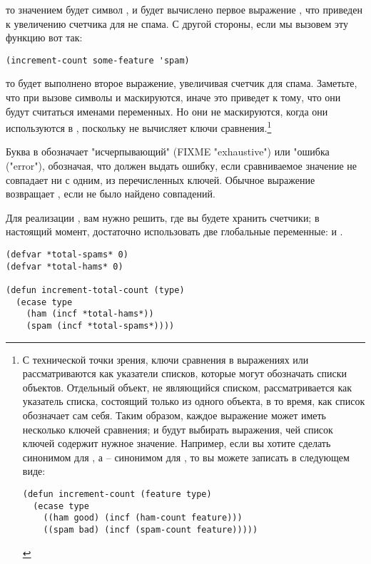 то значением  будет символ , и будет вычислено первое выражение
, что приведен к увеличению счетчика для не спама. С другой стороны, если мы
вызовем эту функцию вот так:

\begin{lstlisting}
(increment-count some-feature 'spam)
\end{lstlisting}

то будет выполнено второе выражение, увеличивая счетчик для спама.  Заметьте, что при
вызове  символы  и  маскируются, иначе это
приведет к тому, что они будут считаться именами переменных.  Но они не маскируются, когда
они используются в , поскольку  не вычисляет ключи
сравнения.\footnote{С технической точки зрения, ключи сравнения в выражениях 
  или  рассматриваются как указатели списков, которые могут обозначать списки
  объектов.  Отдельный объект, не являющийся списком, рассматривается как указатель
  списка, состоящий только из одного объекта, в то время, как список обозначает сам себя.
  Таким образом, каждое выражение может иметь несколько ключей сравнения;  и
   будут выбирать выражения, чей список ключей содержит нужное значение.
  Например, если вы хотите сделать  синонимом для , а  --
  синонимом для , то вы можете записать  в следующем
  виде:

\begin{lstlisting}
(defun increment-count (feature type)
  (ecase type
    ((ham good) (incf (ham-count feature)))
    ((spam bad) (incf (spam-count feature)))))
\end{lstlisting}

}

Буква  в  обозначает "исчерпывающий" (FIXME "exhaustive") или "ошибка
("error"), обозначая, что  должен выдать ошибку, если сравниваемое значение не
совпадает ни с одним, из перечисленных ключей.  Обычное выражение  возвращает
, если не было найдено совпадений.

Для реализации , вам нужно решить, где вы будете хранить
счетчики; в настоящий момент, достаточно использовать две глобальные переменные:
 и .

\begin{lstlisting}
(defvar *total-spams* 0)
(defvar *total-hams* 0)

(defun increment-total-count (type)
  (ecase type
    (ham (incf *total-hams*))
    (spam (incf *total-spams*))))
\end{lstlisting}

